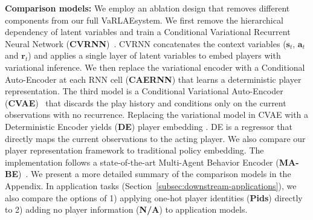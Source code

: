 \documentclass{article}
\newcommand{\state}{\mathbf{s}}
\newcommand{\action}{\mathbf{a}}
\newcommand{\reward}{\boldsymbol{r}}
\newcommand{\system}{VaRLAE\;}
\begin{document}
{\bf Comparison models:}
We employ an ablation design that removes different components from our full \system system. 
We first remove the hierarchical dependency of latent variables and train a Conditional Variational Recurrent Neural Network (\textbf{CVRNN})~\cite{ChungKDGCB15}. CVRNN concatenates the context variables ($\state_{t}$, $\action_{t}$ and $\reward_{t}$) and applies a single layer of latent variables to embed players with variational inference. We then replace the variational encoder with a Conditional Auto-Encoder at each RNN cell (\textbf{CAERNN}) that learns a deterministic player representation. 
The third model is a %
Conditional Variational Auto-Encoder (\textbf{CVAE})~\cite{WalkerDGH16} that discards the play history and conditions only on the current observations with no recurrence.
Replacing the variational model in CVAE with a Deterministic Encoder yields (\textbf{DE})   player embedding \cite{ganguly2018problem}. DE is %
a regressor that directly maps the current observations to the acting player. 
We also compare our player representation framework to  traditional policy embedding. The implementation follows a state-of-the-art %
Multi-Agent Behavior Encoder (\textbf{MA-BE})~\cite{GroverRepresent18}.
We present a more detailed summary of the comparison models in the Appendix.
In application tasks (Section~\ref{subsec:downstream-applications}),
we also compare the options of 1) applying one-hot player identities (\textbf{Pids}) directly to
2) adding no player information (\textbf{N/A}) to application models.
\end{document}
